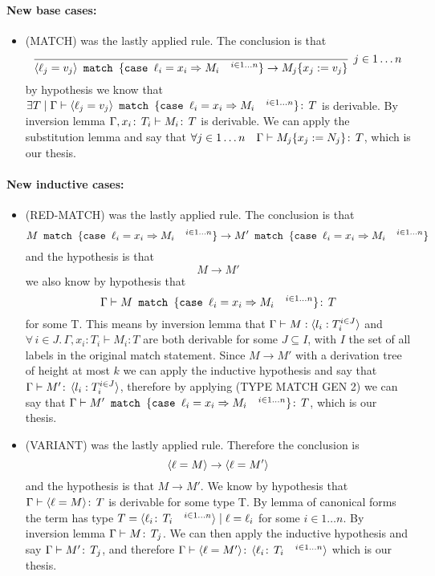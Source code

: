 \paragraph*{New base cases:\\}
\begin{itemize}
\item (MATCH) was the lastly applied rule. The conclusion is
  that \[\infer[j\in 1\dots n]{\MATCH{\VAR{\ell_j = v_j} }{
      \CASE{\ell_i}{x_i}{M_i} \quad^{i\in 1\dots n}} \to
    M_j\SUBST{x_j}{v_j}}{}\] by hypothesis we know that \(\exists T
  \mid \Gamma \vdash \langle \ell_j = v_j \rangle\texttt{ match }\{
    \texttt{case }\ell_i = x_i \Rightarrow M_i \quad^{i\in 1\dots n}\} \!:\,T\) is
  derivable. By inversion lemma \(\Gamma, x_i \!:\,T_i \vdash M_i
  \!:\,T\) is derivable. We can apply the substitution lemma and say
  that \(\forall j \in 1 \dots n \quad \Gamma \vdash M_j
  \{x_j:=N_j\} \!:\,T\), which is our thesis.
\end{itemize}

\paragraph*{New inductive cases:\\}
\begin{itemize}
\item (RED-MATCH) was the lastly applied rule. The conclusion is
  that \[M\texttt{ match }\{\texttt{case }\ell_i = x_i \Rightarrow M_i \quad ^{i\in 1\dots n}\} \to
  M'\texttt{ match }\{\texttt{case }\ell_i = x_i \Rightarrow M_i \quad ^{i\in 1\dots n}\}\] and the
  hypothesis is that \[M\to M'\] we also know by hypothesis
  that \[\Gamma \vdash M\texttt{ match }\{\texttt{case }\ell_i = x_i \Rightarrow M_i \quad ^{i\in
      1\dots n}\} \!:\,T\] for some T. This means by inversion lemma
  that \(\Gamma \vdash M: \langle l_i: T_i^{i \in J} \rangle\) and \(\forall\,
  i \in J.\,\Gamma, x_i: T_i \vdash M_i: T\) are both derivable for
  some \(J\subseteq I\), with \(I\) the set of all labels in the
  original match statement. Since \(M\to M'\) with a derivation tree
  of height at most \(k\) we can apply the inductive hypothesis and
  say that \(\Gamma \vdash M' \!:\,\langle l_i: T_i^{i \in J} \rangle\),
  therefore by applying (TYPE MATCH GEN 2) we can say that
  \(\Gamma\vdash M'\texttt{ match }\{\texttt{case }\ell_i = x_i \Rightarrow M_i \quad ^{i\in
      1\dots n}\} \!:\,T\), which is our thesis.
\item (VARIANT) was the lastly applied rule. Therefore the conclusion
  is \[\langle \ell = M \rangle \to \langle \ell = M' \rangle\] and the hypothesis is that
  \(M\to M'\). We know by hypothesis that \(\Gamma \vdash \langle \ell =
    M \rangle \!:\,T\) is derivable for some type T. By lemma of canonical
  forms the term has type \(T = \langle \ell_i \!:\,T_i \quad^{i\in
      1\dots n} \rangle \mid \ell = \ell_i\) for some \(i\in 1\dots n\). By
  inversion lemma \(\Gamma \vdash M \!:\,T_j\). We can then apply
  the inductive hypothesis and say \(\Gamma \vdash M' \!:\,T_j\),
  and therefore \(\Gamma \vdash \langle \ell = M' \rangle\!:\,\langle \ell_i
      \!:\,T_i \quad^{i\in 1\dots n} \rangle\) which is our thesis.
\end{itemize}
